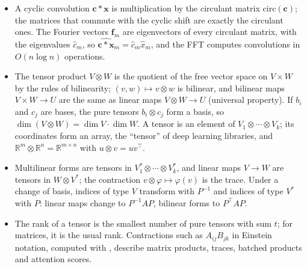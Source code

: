 \begin{itemize}[leftmargin=*]
	\item A cyclic convolution $\mathbf{c} \ast \mathbf{x}$ is multiplication by the circulant matrix $\mathrm{circ}(\mathbf{c})$; the matrices that commute with the cyclic shift are exactly the circulant ones. The Fourier vectors $\mathbf{f}_m$ are eigenvectors of every circulant matrix, with the eigenvalues $\hat{c}_m$, so $\widehat{\mathbf{c} \ast \mathbf{x}}_m = \hat{c}_m\hat{x}_m$, and the FFT computes convolutions in $O(n\log n)$ operations.
	\item The tensor product $V \otimes W$ is the quotient of the free vector space on $V \times W$ by the rules of bilinearity; $(v, w) \mapsto v \otimes w$ is bilinear, and bilinear maps $V \times W \to U$ are the same as linear maps $V \otimes W \to U$ (universal property). If $b_i$ and $c_j$ are bases, the pure tensors $b_i \otimes c_j$ form a basis, so $\dim(V \otimes W) = \dim V \cdot \dim W$. A tensor is an element of $V_1 \otimes \cdots \otimes V_k$; its coordinates form an array, the ``tensor'' of deep learning libraries, and $\mathbb{R}^m \otimes \mathbb{R}^n = \mathbb{R}^{m \times n}$ with $u \otimes v = uv^\top$.
	\item Multilinear forms are tensors in $V_1^* \otimes \cdots \otimes V_k^*$, and linear maps $V \to W$ are tensors in $W \otimes V^*$; the contraction $v \otimes \varphi \mapsto \varphi(v)$ is the trace. Under a change of basis, indices of type $V$ transform with $P^{-1}$ and indices of type $V^*$ with $P$: linear maps change to $P^{-1}AP$, bilinear forms to $P^\top AP$.
	\item The rank of a tensor is the smallest number of pure tensors with sum $t$; for matrices, it is the usual rank. Contractions such as $A_{ij}B_{jk}$ in Einstein notation, computed with , describe matrix products, traces, batched products and attention scores.
\end{itemize}

